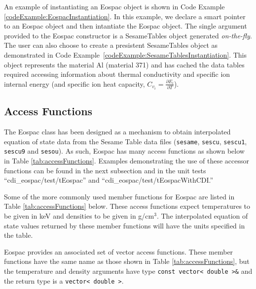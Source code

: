 \documentclass[11pt]{nmemo}
\begin{document}
An example of instantiating an Eospac object is shown in Code Example
\ref{codeExample:EospacInstantiation}.  In this example, we declare a
smart pointer to an Eospac object and then intantiate the Eospac
object.  The single argument provided to the Eospac constructor is a
SesameTables object generated \emph{on-the-fly}.  The user can also
choose to create a presistent SesameTables object as demonstrated in
Code Example~\ref{codeExample:SesameTablesInstantiation}.  This object 
represents the material Al (material 371) and has cached the data
tables required accessing information about thermal conductivity and
specific ion internal energy (and specific ion heat capacity, $C_{v_i} =
\frac{\partial E_i} {\partial T}$).



\subsection{Access Functions}

The Eospac class has been designed as a mechanism to obtain
interpolated equation of state data from the Sesame Table data files
(\texttt{sesame}, \texttt{sescu}, \texttt{sescu1}, \texttt{sescu9} and
\texttt{sesou}).  As such, Eospac has many access functions as shown
below in Table \ref{tab:accessFunctions}.  Examples demonstrating the
use of these accessor functions can be found in the next subsection
and in the unit tests ``cdi\_eospac/test/tEospac'' and
``cdi\_eospac/test/tEospacWithCDI.''


Some of the more commonly used member functions for Eospac are listed
in Table \ref{tab:accessFunctions} below.  These access functions
expect temperatures to be given in keV and densities to be given in
g/cm$^3$.  The interpolated equation of state values returned by these
member functions will have the units specified in the table.

Eospac provides an associated set of vector access functions.  These
member functions have the same name as those shown in
Table \ref{tab:accessFunctions}, but the temperature and density
arguments have type \texttt{const~vector< double >\&} and the return
type is a \texttt{vector< double >}.
\end{document}

